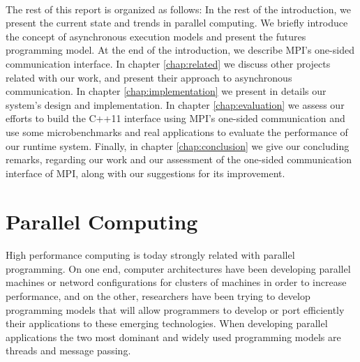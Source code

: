 \paragraph{}
The rest of this report is organized as follows:  In the rest of the introduction, we present the current state
and trends in parallel computing.  We briefly introduce the concept of asynchronous execution models and present
the futures programming model.  At the end of the introduction, we describe MPI's one-sided communication interface.
In chapter \ref{chap:related} we discuss other projects related with our work, and present their approach to
asynchronous communication.  In chapter \ref{chap:implementation} we present in details our system's design and 
implementation.  In chapter \ref{chap:evaluation} we assess our efforts to build the C++11 interface using 
MPI's one-sided communication and use some microbenchmarks and real applications to evaluate the performance
of our runtime system.  Finally, in chapter \ref{chap:conclusion} we give our concluding remarks, regarding our
work and our assessment of the one-sided communication interface of MPI, along with our suggestions for its 
improvement.    


\section{Parallel Computing}
\paragraph{}
	High performance computing is today strongly related with parallel programming.  On one end, computer
architectures have been developing parallel machines or netword configurations for clusters of machines
in order to increase performance, and on the other, researchers have been trying to develop programming
models that will allow programmers to develop or port efficiently their applications to these emerging 
technologies.  When developing parallel applications the two most dominant and widely used programming 
models are threads and message passing.  

